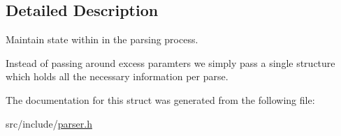 \subsection{Detailed Description}
Maintain state within in the parsing process. 

Instead of passing around excess paramters we simply pass a single structure which holds all the necessary information per parse. 

The documentation for this struct was generated from the following file\+:\begin{DoxyCompactItemize}
\item 
src/include/\mbox{\hyperlink{parser_8h}{parser.\+h}}\end{DoxyCompactItemize}
